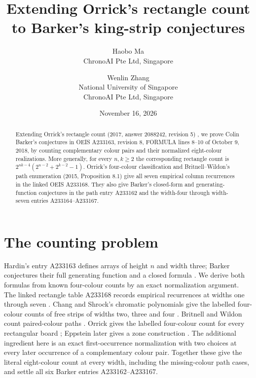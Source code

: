 \documentclass[11pt]{article}
\title{Extending Orrick's rectangle count\\to Barker's king-strip conjectures}
\author{Haobo Ma\\\small ChronoAI Pte Ltd, Singapore
\and Wenlin Zhang\\\small National University of Singapore\\\small ChronoAI Pte Ltd, Singapore}
\date{November 16, 2026}
\begin{document}
\maketitle
\begin{abstract}
Extending Orrick's rectangle count (2017, answer 2088242, revision 5)
\cite{orrick}, we prove Colin Barker's conjectures in OEIS A233163,
revision 8, FORMULA lines 8--10 of October 9, 2018, by counting
complementary colour pairs and their normalized eight-colour realizations.
More generally, for every $n,k\geq2$ the corresponding rectangle count is
$2^{nk-4}(2^{n-2}+2^{k-2}-1)$.
Orrick's four-colour classification and Britnell--Wildon's path enumeration
(2015, Proposition 8.1) \cite{britnell-wildon} give all seven empirical
column recurrences in the linked OEIS A233168.
They also give Barker's closed-form and generating-function conjectures
in the path entry A233162 and the width-four through width-seven entries
A233164--A233167.
\end{abstract}

\section{The counting problem}

Hardin's entry A233163 defines arrays of height $n$ and width three;
Barker conjectures their full generating function and a closed formula
\cite{hardin,barker-source}. We derive both formulas from known
four-colour counts by an exact normalization argument.
The linked rectangle table A233168 records
empirical recurrences at widths one through seven \cite{rectangles}.
Chang and Shrock's chromatic polynomials give the labelled four-colour
counts of free strips of widths two, three and four \cite{chang-shrock}.
Britnell and Wildon count paired-colour paths \cite[Proposition 8.1]{britnell-wildon}.
Orrick gives the labelled four-colour count for every rectangular board
\cite{orrick}; Eppstein later gives a zone construction \cite{eppstein}.
The additional ingredient here is an exact first-occurrence normalization
with two choices at every later occurrence of a complementary colour pair.
Together these give the literal eight-colour count at every width, including
the missing-colour path cases, and settle all six Barker entries A233162--A233167.
\end{document}
